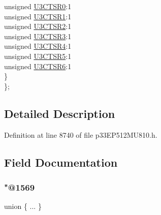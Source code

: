 \begin{DoxyCompactItemize}
\begin{tabbing}
\>\>unsigned \hyperlink{structtag_r_p_i_n_r27_b_i_t_s_ade97d9c1e4939f5106e31c4f9728f199}{U3CTSR0}:1\\
\>\>unsigned \hyperlink{structtag_r_p_i_n_r27_b_i_t_s_a2a9a930da5f56804291112119b173dec}{U3CTSR1}:1\\
\>\>unsigned \hyperlink{structtag_r_p_i_n_r27_b_i_t_s_a79d08908abd4e55ada96d032f5d3b73c}{U3CTSR2}:1\\
\>\>unsigned \hyperlink{structtag_r_p_i_n_r27_b_i_t_s_ae2b4516fd474b7d2c5004370b4cf8654}{U3CTSR3}:1\\
\>\>unsigned \hyperlink{structtag_r_p_i_n_r27_b_i_t_s_a52b0145e880bf63734b33482251372b9}{U3CTSR4}:1\\
\>\>unsigned \hyperlink{structtag_r_p_i_n_r27_b_i_t_s_a330fb886f9c6a20d6566cc6865648dc9}{U3CTSR5}:1\\
\>\>unsigned \hyperlink{structtag_r_p_i_n_r27_b_i_t_s_ab5a7574f9f6dd25d45988d5293357659}{U3CTSR6}:1\\
\>\} \\
\}; \\

\end{tabbing}\end{DoxyCompactItemize}


\subsection{Detailed Description}


Definition at line 8740 of file p33\+E\+P512\+M\+U810.\+h.



\subsection{Field Documentation}
\mbox{\label{structtag_r_p_i_n_r27_b_i_t_s_a3a4f4c0957ae671c69a7cb51b8c67610}} 
\subsubsection{\texorpdfstring{"@1569}{@1569}}
{\footnotesize\ttfamily union \{ ... \} }

\mbox{\label{structtag_r_p_i_n_r27_b_i_t_s_adf71f3d8410c1f1dbbc96680a92c49af}} 
